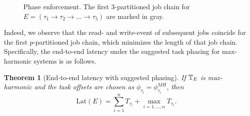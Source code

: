 \documentclass[10pt,conference]{resources/IEEEtran}
\newtheorem{theorem}{Theorem}%
\theoremstyle{definition}
\newcommand{\lat}{\mathrm{Lat}}
\begin{document}
\begin{figure}
			\caption{Phase enforcement. The first $3$-partitioned job chain for $E=(\tau_1 \to \tau_2 \to \dots \to \tau_5)$ are marked in gray.}
			\label{fig:phasing}
	\end{figure}
	Indeed, we observe that the read- and write-event of subsequent jobs coincide for the first $p$-partitioned job chain, which minimizes the length of that job chain.
	Specifically, the end-to-end latency under the suggested task phasing for max-harmonic systems is as follows.

	\begin{theorem}[End-to-end latency with suggested phasing]\label{thm:e2e_with_phasing_harm}
		If $\mathbb{T}_E$ is max-harmonic and the task offsets are chosen as $\phi_{\tau_i} = \phi^{\mathit{MH}}_{\tau_i}$, then 
		\begin{equation}
			\lat(E) = \sum_{i=1}^{n} T_{\tau_i} + \max_{i=1, \dots, n} T_{\tau_i}.
		\end{equation}
	\end{theorem}
\end{document}
